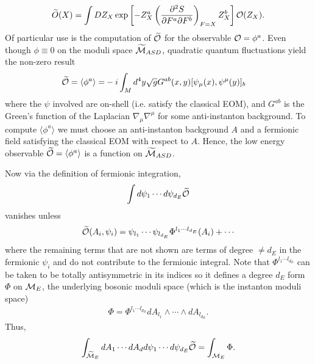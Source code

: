 \documentclass[12pt, onecolumn]{article}
\begin{document}
\begin{align*}
\widetilde{O}(X)=\int DZ_{X} \exp\left[-Z_{X}^{a}\left(\frac{\partial^2 S}{\partial F^{a} \partial F^{b}}\right)_{F=X}Z_{X}^{b}\right]{\cal O}(Z_{X}).
\end{align*}
Of particular use is the computation of $\widetilde{\cal O}$ for the observable ${\cal O}=\phi^{a}$.  Even though $\phi \equiv 0$ on the moduli space $\widetilde{\cal M}_{ASD}$, quadratic quantum fluctuations yield the non-zero result
\begin{align*}
\widetilde{{\cal O}}=\langle \phi^{a} \rangle=&-i \int_{M} d^{4}y \sqrt{g} G^{ab}(x,y)[\psi_{\mu}(x),\psi^{\mu}(y)]_{b}
\end{align*}
where the $\psi$ involved are on-shell (i.e. satisfy the classical EOM), and $G^{ab}$ is the Green's function of the Laplacian $\nabla_{\mu}\nabla^{\mu}$ for some anti-instanton background.  To compute $\langle \phi^{a} \rangle$ we must choose an anti-instanton background $A$ and a fermionic field satisfying the classical EOM with respect to $A$.  Hence, the low energy observable $\widetilde{\cal O}=\langle \phi^{a} \rangle$ is a function on $\widetilde{\cal M}_{ASD}$.

\vspace{5mm}

\noindent Now via the definition of fermionic integration,
\begin{align*}
\int  d\psi_{1}\cdots d\psi_{d_{E}}\widetilde{\cal O}
\end{align*}
vanishes unless
\begin{align*}
\widetilde{\cal O}(A_{i},\psi_{i})=\psi_{l_{1}}\cdots\psi_{l_{d_{E}}}\Phi^{l_{1} \cdots l_{d_{E}}}(A_{i})+\cdots
\end{align*}
where the remaining terms that are not shown are terms of degree $\neq d_{E}$ in the fermionic $\psi_{i}$ and do not contribute to the fermionic integral.  Note that $\Phi^{l_{1} \cdots l_{d_{E}}}$ can be taken to be totally antisymmetric in its indices so it defines a degree $d_{E}$ form $\Phi$ on ${\cal M}_{E}$, the underlying bosonic moduli space (which is the instanton moduli space)
\begin{align*}
\Phi=\Phi^{l_{1} \cdots l_{d_{E}}} dA_{l_{1}} \wedge \cdots \wedge dA_{l_{d_{E}}}.
\end{align*}
Thus,
\begin{align*}
\int_{\widetilde{{\cal M}}_{E}}dA_{1}\cdots dA_{d} d\psi_{1}\cdots d\psi_{d_{E}}\widetilde{{\cal O}}=\int_{{\cal M}_{E}}\Phi.
\end{align*}
\end{document}
